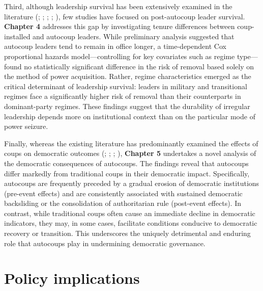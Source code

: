 \documentclass[
  12pt,
]{report}
\begin{document}
Third, although leadership survival has been extensively examined in the
literature (; ;
;
;
), few studies have focused on post-autocoup leader survival.
\textbf{Chapter 4} addresses this gap by investigating tenure
differences between coup-installed and autocoup leaders. While
preliminary analysis suggested that autocoup leaders tend to remain in
office longer, a time-dependent Cox proportional hazards
model---controlling for key covariates such as regime type---found no
statistically significant difference in the risk of removal based solely
on the method of power acquisition. Rather, regime characteristics
emerged as the critical determinant of leadership survival: leaders in
military and transitional regimes face a significantly higher risk of
removal than their counterparts in dominant-party regimes. These
findings suggest that the durability of irregular leadership depends
more on institutional context than on the particular mode of power
seizure.

Finally, whereas the existing literature has predominantly examined the
effects of coups on democratic outcomes (; ; ;
), \textbf{Chapter 5}
undertakes a novel analysis of the democratic consequences of autocoups.
The findings reveal that autocoups differ markedly from traditional
coups in their democratic impact. Specifically, autocoups are frequently
preceded by a gradual erosion of democratic institutions (pre-event
effects) and are consistently associated with sustained democratic
backsliding or the consolidation of authoritarian rule (post-event
effects). In contrast, while traditional coups often cause an immediate
decline in democratic indicators, they may, in some cases, facilitate
conditions conducive to democratic recovery or transition. This
underscores the uniquely detrimental and enduring role that autocoups
play in undermining democratic governance.

\section{Policy implications}\label{policy-implications-1}
\end{document}
